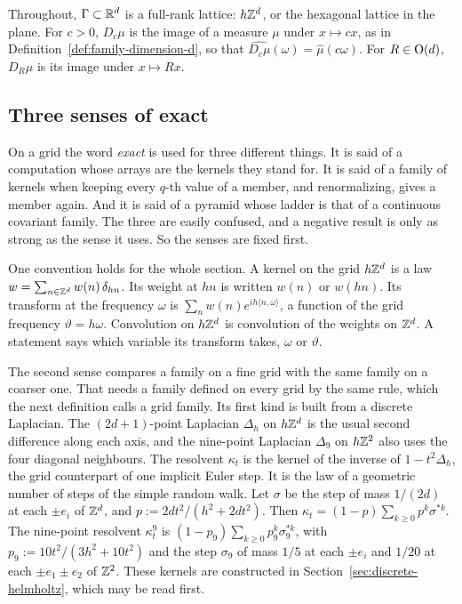 Throughout, $\Gamma \subset \mathbb{R}^d$ is a full-rank lattice: $h\mathbb{Z}^d$, or the hexagonal lattice in
the plane. For $c > 0$, $D_c\mu$ is the image of a measure $\mu$ under $x \mapsto cx$, as in
Definition~\ref{def:family-dimension-d}, so that $\widehat{D_c\mu}(\omega) = \widehat{\mu}(c\omega)$.
For $R \in \mathrm{O}(d)$, $D_R\mu$ is its image under $x \mapsto Rx$.

\subsection{Three senses of exact}
\label{sec:price-senses}

On a grid the word \emph{exact} is used for three different things. It is said of a computation
whose arrays are the kernels they stand for. It is said of a family of kernels when keeping every
$q$-th value of a member, and renormalizing, gives a member again. And it is said of a pyramid
whose ladder is that of a continuous covariant family. The three are easily confused, and a
negative result is only as strong as the sense it uses. So the senses are fixed first.

One convention holds for the whole section. A kernel on the grid $h\mathbb{Z}^d$ is a law
$w = \sum_{n \in \mathbb{Z}^d} w(n)\,\delta_{hn}$. Its weight at $hn$ is written $w(n)$ or $w(hn)$. Its
transform at the frequency $\omega$ is $\sum_n w(n)e^{ih\langle n, \omega\rangle}$, a function of
the grid frequency $\vartheta = h\omega$. Convolution on $h\mathbb{Z}^d$ is convolution of the weights on
$\mathbb{Z}^d$. A statement says which variable its transform takes, $\omega$ or $\vartheta$.

The second sense compares a family on a fine grid with the same family on a coarser one. That needs
a family defined on every grid by the same rule, which the next definition calls a grid family. Its
first kind is built from a discrete Laplacian. The $(2d+1)$-point Laplacian $\Delta_h$ on $h\mathbb{Z}^d$
is the usual second difference along each axis, and the nine-point Laplacian $\Delta_9$ on $h\mathbb{Z}^2$
also uses the four diagonal neighbours. The resolvent $\kappa_t$ is the kernel of the inverse of
$1 - t^2\Delta_h$, the grid counterpart of one implicit Euler step. It is the law of a geometric
number of steps of the simple random walk. Let $\sigma$ be the step of mass $1/(2d)$ at each
$\pm e_i$ of $\mathbb{Z}^d$, and $p := 2dt^2/(h^2 + 2dt^2)$. Then $\kappa_t = (1-p)\sum_{k \ge 0}p^k\sigma^{*k}$.
The nine-point resolvent $\kappa^9_t$ is $(1-p_9)\sum_{k \ge 0}p_9^k\sigma_9^{*k}$, with
$p_9 := 10t^2/(3h^2 + 10t^2)$ and the step $\sigma_9$ of mass $1/5$ at each $\pm e_i$ and $1/20$ at
each $\pm e_1 \pm e_2$ of $\mathbb{Z}^2$. These kernels are constructed in
Section~\ref{sec:discrete-helmholtz}, which may be read first.

